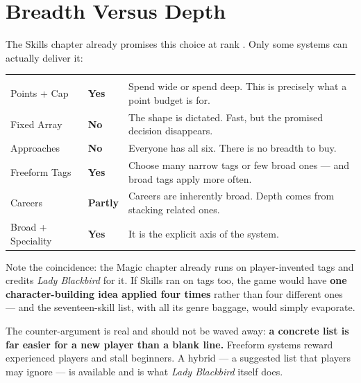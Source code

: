 \documentclass[11pt,oneside]{memoir}
\newcommand{\thc}[1]{\leavevmode{\hdfont\bfseries\color{white}#1}}
\begin{document}
\section{Breadth Versus Depth}

The Skills chapter already promises this choice at rank . Only
some systems can actually deliver it:

\begin{center}
\setlength{\tabcolsep}{6pt}\renewcommand{\arraystretch}{1.3}
\begin{tabularx}{\textwidth}{@{}p{3.6cm} >{\leavevmode\centering\arraybackslash}p{2.9cm} Y@{}}
\rowcolor{\realmaccent}
\thc{System} &
\thc{Offers the choice?} &
\thc{Why}\\
Points + Cap & \textcolor{columnSkills}{\bfseries Yes} & Spend wide or spend deep. This is precisely what a point budget is for.\\
Fixed Array & \textcolor{columnBody}{\bfseries No} & The shape is dictated. Fast, but the promised decision disappears.\\
Approaches & \textcolor{columnBody}{\bfseries No} & Everyone has all six. There is no breadth to buy.\\
Freeform Tags & \textcolor{columnSkills}{\bfseries Yes} & Choose many narrow tags or few broad ones --- and broad tags apply more often.\\
Careers & \textcolor{atrAccent2}{\bfseries Partly} & Careers are inherently broad. Depth comes from stacking related ones.\\
Broad + Speciality & \textcolor{columnSkills}{\bfseries Yes} & It is the explicit axis of the system.\\
\end{tabularx}
\end{center}

\begin{dread}
Note the coincidence: the Magic chapter already runs on player-invented
tags and credits \emph{Lady Blackbird} for it. If Skills ran on tags too,
the game would have \textbf{one character-building idea applied four
times} rather than four different ones --- and the seventeen-skill list,
with all its genre baggage, would simply evaporate.

The counter-argument is real and should not be waved away: \textbf{a
concrete list is far easier for a new player than a blank line.} Freeform
systems reward experienced players and stall beginners. A hybrid --- a
suggested list that players may ignore --- is available and is what
\emph{Lady Blackbird} itself does.
\end{dread}
\end{document}
